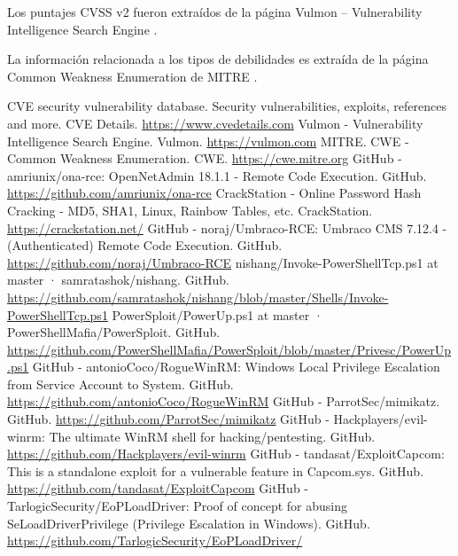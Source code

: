 \documentclass[a4paper]{article}
\begin{document}
\vspace{0.1cm}
Los puntajes CVSS v2 fueron extraídos de la página Vulmon – Vulnerability Intelligence Search Engine \cite{vulmon}.

\vspace{0.1cm}
La información relacionada a los tipos de debilidades es extraída de la página Common Weakness Enumeration de MITRE \cite{cwe}.
\clearpage
    
    
    
    

\clearpage
\begin{thebibliography}{0}
     CVE security vulnerability database. Security vulnerabilities, exploits, references and more. CVE Details. \href{https://www.cvedetails.com}{https://www.cvedetails.com}
     Vulmon - Vulnerability Intelligence Search Engine. Vulmon. \href{https://vulmon.com}{https://vulmon.com}
     MITRE. CWE - Common Weakness Enumeration. CWE. \href{https://cwe.mitre.org}{https://cwe.mitre.org}
     GitHub - amriunix/ona-rce: OpenNetAdmin 18.1.1 - Remote Code Execution. GitHub. \href{https://github.com/amriunix/ona-rce}{https://github.com/amriunix/ona-rce}
     CrackStation - Online Password Hash Cracking - MD5, SHA1, Linux, Rainbow Tables, etc. CrackStation. \href{https://crackstation.net/}{https://crackstation.net/}
     GitHub - noraj/Umbraco-RCE: Umbraco CMS 7.12.4 - (Authenticated) Remote Code Execution. GitHub. \href{https://github.com/noraj/Umbraco-RCE}{https://github.com/noraj/Umbraco-RCE}
     nishang/Invoke-PowerShellTcp.ps1 at master · samratashok/nishang. GitHub. \href{https://github.com/samratashok/nishang/blob/master/Shells/Invoke-PowerShellTcp.ps1}{https://github.com/samratashok/nishang/blob/master/Shells/Invoke-PowerShellTcp.ps1}
     PowerSploit/PowerUp.ps1 at master · PowerShellMafia/PowerSploit. GitHub. \href{https://github.com/PowerShellMafia/PowerSploit/blob/master/Privesc/PowerUp.ps1}{https://github.com/PowerShellMafia/PowerSploit/blob/master/Privesc/PowerUp.ps1}
     GitHub - antonioCoco/RogueWinRM: Windows Local Privilege Escalation from Service Account to System. GitHub. \href{https://github.com/antonioCoco/RogueWinRM}{https://github.com/antonioCoco/RogueWinRM}
     GitHub - ParrotSec/mimikatz. GitHub. \href{https://github.com/ParrotSec/mimikatz}{https://github.com/ParrotSec/mimikatz}
     GitHub - Hackplayers/evil-winrm: The ultimate WinRM shell for hacking/pentesting. GitHub. \href{https://github.com/Hackplayers/evil-winrm}{https://github.com/Hackplayers/evil-winrm}
     GitHub - tandasat/ExploitCapcom: This is a standalone exploit for a vulnerable feature in Capcom.sys. GitHub. \href{https://github.com/tandasat/ExploitCapcom}{https://github.com/tandasat/ExploitCapcom}
     GitHub - TarlogicSecurity/EoPLoadDriver: Proof of concept for abusing SeLoadDriverPrivilege (Privilege Escalation in Windows). GitHub. \href{https://github.com/TarlogicSecurity/EoPLoadDriver/}{https://github.com/TarlogicSecurity/EoPLoadDriver/}
\end{thebibliography}
\end{document}
